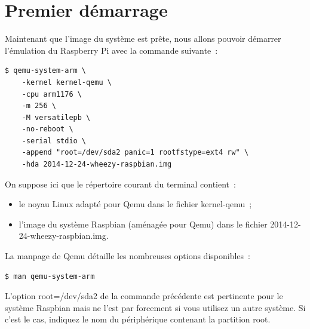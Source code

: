 \documentclass{article}
\begin{document}





\section{Premier démarrage}\label{sec:first-boot}

Maintenant que l'image du système est prête, nous allons pouvoir démarrer l'émulation du Raspberry Pi avec la commande suivante~:
\begin{verbatim}
$ qemu-system-arm \
    -kernel kernel-qemu \
    -cpu arm1176 \
    -m 256 \
    -M versatilepb \
    -no-reboot \
    -serial stdio \
    -append "root=/dev/sda2 panic=1 rootfstype=ext4 rw" \
    -hda 2014-12-24-wheezy-raspbian.img
\end{verbatim}

On suppose ici que le répertoire courant du terminal contient~:
\begin{itemize}
    \item le noyau Linux adapté pour Qemu dans le fichier \og{}kernel-qemu\fg{}~;
    \item l'image du système Raspbian (aménagée pour Qemu) dans le fichier \og{}2014-12-24-wheezy-raspbian.img\fg{}.
\end{itemize}

La manpage de Qemu détaille les nombreuses options disponibles~:
\begin{verbatim}
$ man qemu-system-arm
\end{verbatim}

L'option \og{}root=/dev/sda2\fg{} de la commande précédente est pertinente pour
le système Raspbian mais ne l'est par forcement si vous utilisez un autre
système. Si c'est le cas, indiquez le nom du périphérique contenant la
partition root.
\end{document}
